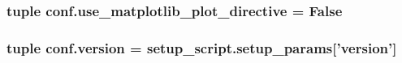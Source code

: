 \subsubsection[{use\+\_\+matplotlib\+\_\+plot\+\_\+directive}]{\setlength{\rightskip}{0pt plus 5cm}tuple conf.\+use\+\_\+matplotlib\+\_\+plot\+\_\+directive = {\bf False}}\label{namespaceconf_a5f8d625775786514c1bd1cd7a6650d69}
\hypertarget{namespaceconf_ae6c322f623b44d2a866d51d0b645d3d2}{}
\subsubsection[{version}]{\setlength{\rightskip}{0pt plus 5cm}tuple conf.\+version = setup\+\_\+script.\+setup\+\_\+params\mbox{[}'version'\mbox{]}}\label{namespaceconf_ae6c322f623b44d2a866d51d0b645d3d2}
